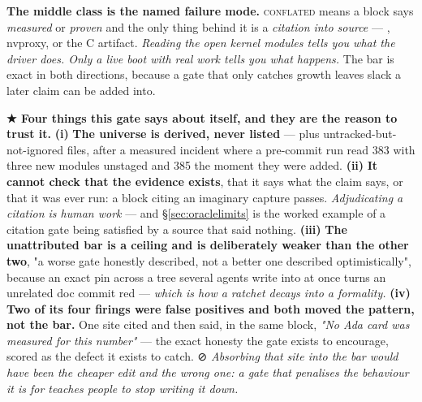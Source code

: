 \documentclass[10.5pt]{article}
\begin{document}
\textbf{The middle class is the named failure mode.} \textsc{conflated} means a block says
\emph{measured} or \emph{proven} and the only thing behind it is a \emph{citation into source} —
, nvproxy, or the C artifact. \emph{Reading the open kernel modules tells you what the
driver does. Only a live boot with real work tells you what happens.} The bar is exact in both
directions, because a gate that only catches growth leaves slack a later claim can be added into.

\begin{claimbox}\small
\textbf{★ Four things this gate says about itself, and they are the reason to trust it.}
\textbf{(i)} \textbf{The universe is derived, never listed} —  plus
untracked-but-not-ignored files, after a measured incident where a pre-commit run read 383 with
three new modules unstaged and 385 the moment they were added. \textbf{(ii)} \textbf{It cannot
check that the evidence exists}, that it says what the claim says, or that it was ever run: a
block citing an imaginary capture passes. \emph{Adjudicating a citation is human work} — and
\S\ref{sec:oraclelimits} is the worked example of a citation gate being satisfied by a source
that said nothing. \textbf{(iii)} \textbf{The unattributed bar is a ceiling and is deliberately
weaker than the other two}, "a worse gate honestly described, not a better one described
optimistically", because an exact pin across a tree several agents write into at once turns an
unrelated doc commit red — \emph{which is how a ratchet decays into a formality.}
\textbf{(iv)} \textbf{Two of its four firings were false positives and both moved the pattern,
not the bar.} One site cited  and then said, in the same block, \emph{"No Ada card was
measured for this number"} — the exact honesty the gate exists to encourage, scored as the defect
it exists to catch. ⊘ \emph{Absorbing that site into the bar would have been the cheaper edit and
the wrong one: a gate that penalises the behaviour it is for teaches people to stop writing it
down.}
\end{claimbox}
\end{document}
